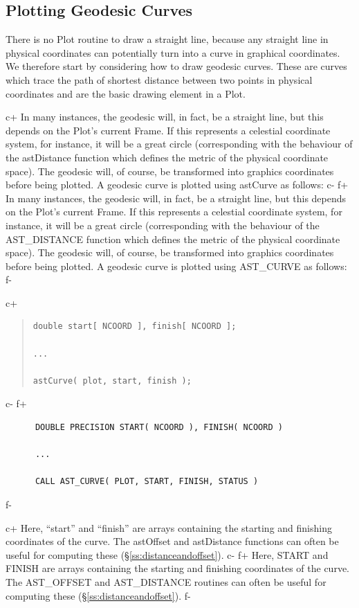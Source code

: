\documentclass[twoside,11pt]{article}
\newcommand{\secref}[1]{\S\ref{#1}}
\newcommand{\secref}[1]{\ref{#1}}
\begin{document}
\subsection{\label{ss:plottinggeodesics}Plotting Geodesic Curves}

There is no Plot routine to draw a straight line, because any straight
line in physical coordinates can potentially turn into a curve in
graphical coordinates. We therefore start by considering how to draw
geodesic curves.  These are curves which trace the path of shortest
distance between two points in physical coordinates
 and are the basic drawing element in a Plot. 

c+
In many instances, the geodesic will, in fact, be a straight line, but
this depends on the Plot's current Frame. If this represents a
celestial coordinate system, for instance, it will be a great circle
(corresponding with the behaviour of the astDistance function which
defines the metric of the physical coordinate space).  The geodesic
will, of course, be transformed into graphics coordinates before being
plotted. A geodesic curve is plotted using astCurve as follows:
c-
f+
In many instances, the geodesic will, in fact, be a straight line, but
this depends on the Plot's current Frame. If this represents a
celestial coordinate system, for instance, it will be a great circle
(corresponding with the behaviour of the AST\_DISTANCE function which
defines the metric of the physical coordinate space).  The geodesic
will, of course, be transformed into graphics coordinates before being
plotted. A geodesic curve is plotted using AST\_CURVE as follows:
f-

c+
\begin{quote}
\small
\begin{verbatim}
double start[ NCOORD ], finish[ NCOORD ];

...

astCurve( plot, start, finish );
\end{verbatim}
\normalsize
\end{quote}
c-
f+
\small
\begin{verbatim}
      DOUBLE PRECISION START( NCOORD ), FINISH( NCOORD )

      ...

      CALL AST_CURVE( PLOT, START, FINISH, STATUS )
\end{verbatim}
\normalsize
f-

c+
Here, ``start'' and ``finish'' are arrays containing the starting and
finishing coordinates of the curve. The astOffset and astDistance
functions can often be useful for computing these
(\secref{ss:distanceandoffset}).
c-
f+
Here, START and FINISH are arrays containing the starting and
finishing coordinates of the curve. The AST\_OFFSET and AST\_DISTANCE
routines can often be useful for computing these
(\secref{ss:distanceandoffset}).
f-
\end{document}
